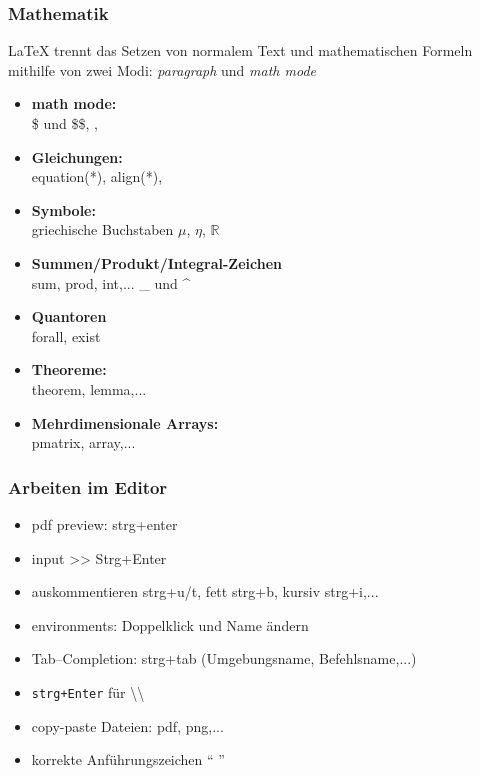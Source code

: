\subsubsection{Mathematik}
LaTeX trennt das Setzen von normalem Text und mathematischen Formeln mithilfe von zwei Modi: \textit{paragraph} und \textit{math mode}
\begin{itemize}
	\item \textbf{math mode:}\\
	\$ und \$\$, \latexCommands{[}, \latexCommands{]}
	\item \textbf{Gleichungen:} \\
	equation(*), align(*),
	\item \textbf{Symbole:} \\
	griechische Buchstaben $\mu$, $\eta$, $\mathbb{R}$
	\item \textbf{Summen/Produkt/Integral-Zeichen}\\
	sum, prod, int,... \_ und \^{} 
	\item \textbf{Quantoren}\\
	forall, exist
	\item \textbf{Theoreme:} \\
	theorem, lemma,...
	\item \textbf{Mehrdimensionale Arrays:}\\
	pmatrix, array,...
\end{itemize}


\subsubsection{Arbeiten im Editor}
\begin{itemize}
	\item pdf preview: strg+enter
	\item input >> Strg+Enter
	\item {} auskommentieren strg+u/t, fett strg+b, kursiv strg+i,...
	\item environments: Doppelklick und Name ändern
	\item Tab--Completion: strg+tab (Umgebungsname, Befehlsname,...)
	\item \texttt{strg+Enter} für \textbackslash\textbackslash
	\item copy-paste Dateien: pdf, png,...
	\item korrekte Anführungszeichen `` ''
\end{itemize}


